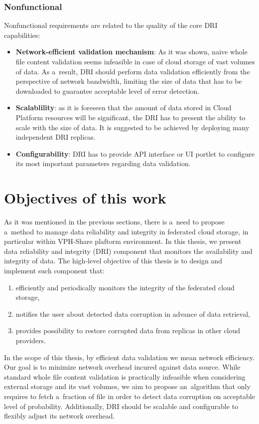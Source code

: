 \subsubsection*{Nonfunctional}
Nonfunctional requirements are related to the quality of the core DRI capabilities:
\begin{itemize}
	\item \textbf{Network-efficient validation mechanism}: As it was shown, naive
	whole file content validation seems infeasible in case of cloud storage of vast volumes
	of data. As a~result, DRI should perform data validation efficiently from the perspective
	of network bandwidth, limiting the size of data that has to be downloaded to guarantee acceptable
	level of error detection.
	\item \textbf{Scalablility}: as it is foreseen that the amount of data
	stored in Cloud Platform resources will be significant, the DRI has to
	present the ability to scale with the size of data. It is suggested to be
	achieved by deploying many independent DRI replicas. 
	\item \textbf{Configurability}: DRI has to provide API interface or UI
	portlet to configure its most important parameters regarding data validation.
\end{itemize}


\section{Objectives of this work}

As it was mentioned in the previous sections, there is a~need to propose a~method to manage
data reliability and integrity in federated cloud storage, in particular within VPH-Share plaftorm
environment. In this thesis, we present data reliability and integrity (DRI) component that monitors
the availability and integrity of data. The high-level objective of this thesis is to design and
implement such component that:

\begin{enumerate}
\item efficiently and  periodically monitors the integrity of the federated cloud storage,
\item notifies the user about detected data corruption in advance of data retrieval, 
\item provides possibility to restore corrupted data from replicas in other cloud providers.
\end{enumerate}

In the scope of this thesis, by efficient data validation we mean network efficiency. Our goal is to
minimize network overhead incured against data source. While standard whole file content validation
is practically infeasible when considering external storage and its vast volumes, we aim to propose
an~algorithm that only requires to fetch a~fraction of file in order to detect data corruption on acceptable
level of probability. Additionally, DRI should be scalable and configurable to flexibly adjust its
network overhead.\\

